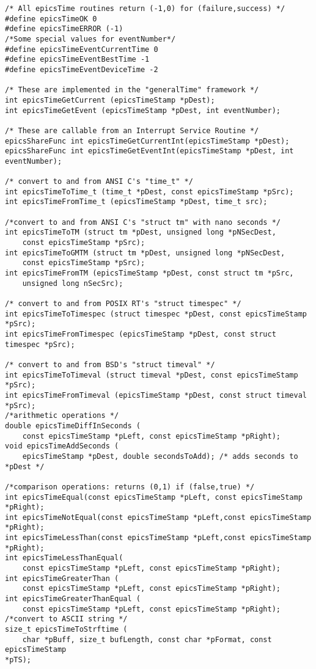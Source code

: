\begin{verbatim}/* All epicsTime routines return (-1,0) for (failure,success) */
#define epicsTimeOK 0
#define epicsTimeERROR (-1)
/*Some special values for eventNumber*/
#define epicsTimeEventCurrentTime 0
#define epicsTimeEventBestTime -1
#define epicsTimeEventDeviceTime -2

/* These are implemented in the "generalTime" framework */
int epicsTimeGetCurrent (epicsTimeStamp *pDest);
int epicsTimeGetEvent (epicsTimeStamp *pDest, int eventNumber);

/* These are callable from an Interrupt Service Routine */
epicsShareFunc int epicsTimeGetCurrentInt(epicsTimeStamp *pDest);
epicsShareFunc int epicsTimeGetEventInt(epicsTimeStamp *pDest, int eventNumber);

/* convert to and from ANSI C's "time_t" */
int epicsTimeToTime_t (time_t *pDest, const epicsTimeStamp *pSrc);
int epicsTimeFromTime_t (epicsTimeStamp *pDest, time_t src);

/*convert to and from ANSI C's "struct tm" with nano seconds */
int epicsTimeToTM (struct tm *pDest, unsigned long *pNSecDest,
    const epicsTimeStamp *pSrc);
int epicsTimeToGMTM (struct tm *pDest, unsigned long *pNSecDest,
    const epicsTimeStamp *pSrc);
int epicsTimeFromTM (epicsTimeStamp *pDest, const struct tm *pSrc,
    unsigned long nSecSrc);

/* convert to and from POSIX RT's "struct timespec" */
int epicsTimeToTimespec (struct timespec *pDest, const epicsTimeStamp *pSrc);
int epicsTimeFromTimespec (epicsTimeStamp *pDest, const struct timespec *pSrc);

/* convert to and from BSD's "struct timeval" */
int epicsTimeToTimeval (struct timeval *pDest, const epicsTimeStamp *pSrc);
int epicsTimeFromTimeval (epicsTimeStamp *pDest, const struct timeval *pSrc);
/*arithmetic operations */
double epicsTimeDiffInSeconds (
    const epicsTimeStamp *pLeft, const epicsTimeStamp *pRight);
void epicsTimeAddSeconds (
    epicsTimeStamp *pDest, double secondsToAdd); /* adds seconds to *pDest */

/*comparison operations: returns (0,1) if (false,true) */
int epicsTimeEqual(const epicsTimeStamp *pLeft, const epicsTimeStamp *pRight);
int epicsTimeNotEqual(const epicsTimeStamp *pLeft,const epicsTimeStamp *pRight);
int epicsTimeLessThan(const epicsTimeStamp *pLeft,const epicsTimeStamp *pRight);
int epicsTimeLessThanEqual(
    const epicsTimeStamp *pLeft, const epicsTimeStamp *pRight);
int epicsTimeGreaterThan (
    const epicsTimeStamp *pLeft, const epicsTimeStamp *pRight);
int epicsTimeGreaterThanEqual (
    const epicsTimeStamp *pLeft, const epicsTimeStamp *pRight);
/*convert to ASCII string */
size_t epicsTimeToStrftime (
    char *pBuff, size_t bufLength, const char *pFormat, const epicsTimeStamp 
*pTS);


\end{verbatim}
